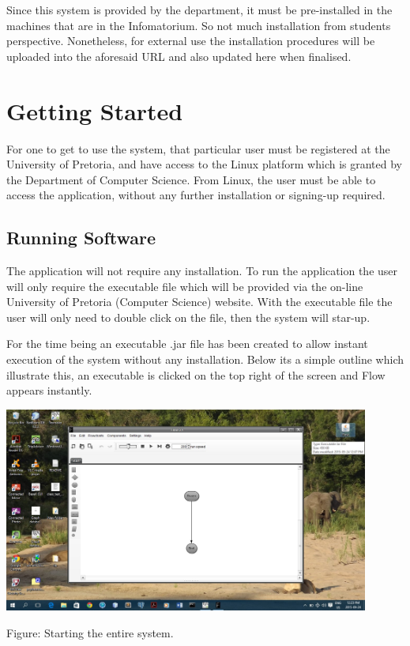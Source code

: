\documentclass[11pt,a4paper,titlepage]{article}
\begin{document}
		Since this system is provided by the department, it must be pre-installed in the machines that are in the Infomatorium. So not much installation from students perspective. Nonetheless, for external use the installation procedures will be uploaded into the aforesaid URL and also updated here when finalised. 
		

\section{Getting Started}
	
	For one to get to use the system, that particular user must be registered at the University of Pretoria, and have access to the Linux platform which is granted by the Department of Computer Science. From Linux, the user must be able to access the application, without any further installation or signing-up required.





	
	\subsection{Running Software}
	
	
		The application will not require any installation. To run the application the user will only require the executable file which will be provided via the on-line University of Pretoria (Computer Science) website. With the executable file the user will only need to double click on the file, then the system will star-up.
		
		For the time being an executable .jar file has been created to allow instant execution of the system without any installation. Below its a simple outline which illustrate this, an executable is clicked on the top right of the screen and Flow appears instantly. \newline \newline
		
		\includegraphics[width=12cm]{RunningFlow.jpg}
			\begin{center}
		Figure: Starting the entire system.\newline
		\end{center} 
		
\end{document}
